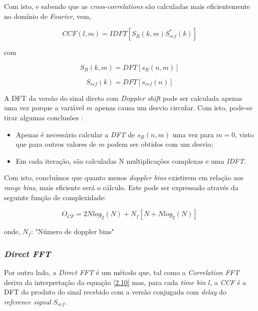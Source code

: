 Com isto, e sabendo que as \textit{cross-correlations} são calculadas mais eficientemente no domínio de \textit{Fourier}, vem,

\begin{equation} \label{2.14}
CCF\left(l,m\right) = IDFT\left[ S_{R}\left( k,m\right)S_{ref}^{\ast}\left(k\right)\right] 
\end{equation}

com 

\begin{equation} \label{2.15}
S_{R}\left( k,m\right)  = DFT\left[ s_{R}\left( n,m\right) \right] 
\end{equation}

\begin{equation} \label{2.16}
S_{ref}\left( k\right)  = DFT\left[ s_{ref}\left( n\right) \right] 
\end{equation}

A \gls{DFT} da versão do sinal direto com \textit{Doppler shift} pode ser calculada apenas uma vez porque a variável $m$ apenas causa um desvio circular.
Com isto, pode-se tirar algumas conclusões \parencite{Martorella}:
\begin{itemize}
\item Apenas é necessário calcular a \textit{\gls{DFT}} de $s_{R}\left( n,m\right)$ uma vez para $m=0$, visto que para outros valores de $m$ podem ser obtidos com um desvio;
\item Em cada iteração, são calculadas N multiplicações complexas e uma \textit{\gls{IDFT}}.
\end{itemize}

Com isto, concluímos que quanto menos \textit{doppler bins} existirem em relação aos \textit{range bins}, mais eficiente será o cálculo. Este pode ser expressado através da seguinte função de complexidade:

\begin{equation} \label{2.17}
O_{CF}=2Nlog_{2}(N)+N_{f}[N+Nlog_{2}(N)]
\end{equation}

onde,
$N_{f}$: "Número de doppler bins"

\subsubsection*{\textit{Direct FFT}}
Por outro lado, a \textit{Direct FFT} é um método que, tal como a \textit{Correlation FFT} deriva da interpretação da equação \ref{2.10} mas, para cada \textit{time bin} $l$, a \textit{\gls{CCF}} é a \gls{DFT} do produto do sinal recebido com a versão conjugada com \textit{delay} do \textit{reference signal} $S_{ref}$.

